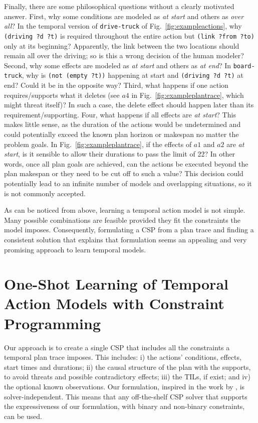 \documentclass[runningheads]{llncs}
\begin{document}
Finally, there are some philosophical questions without a clearly motivated answer. First, why some conditions are modeled as \emph{at start} and others as \emph{over all}? In the temporal version of \texttt{drive-truck} of Fig.~\ref{fig:exampleactions}, why \texttt{(driving ?d ?t)} is required throughout the entire action but \texttt{(link ?from ?to)} only at its beginning? Apparently, the link between the two locations should remain all over the driving; so is this a wrong decision of the human modeler?
Second, why some effects are modeled as \emph{at start} and others as \emph{at end}? In \texttt{board-truck}, why is \texttt{(not (empty ?t))} happening at start and \texttt{(driving ?d ?t)} at end? Could it be in the opposite way?
Third, what happens if one action requires/supports what it deletes (see $a4$ in Fig.~\ref{fig:exampleplantrace}, which might threat itself)? In such a case, the delete effect should happen later than its requirement/supporting.
Four, what happens if all effects are \emph{at start}? This makes little sense, as the duration of the actions would be undetermined and could potentially exceed the known plan horizon or makespan no matter the problem goals. In Fig.~\ref{fig:exampleplantrace}, if the effects of $a1$ and $a2$ are \emph{at start}, is it sensible to allow their durations to pass the limit of 22? In other words, once all plan goals are achieved, can the actions be executed beyond the plan makespan or they need to be cut off to such a value? This decision could potentially lead to an infinite number of models and overlapping situations, so it is not commonly accepted.

As can be noticed from above, learning a temporal action model is not simple. Many possible combinations are feasible provided they fit the constraints the model imposes. Consequently, formulating a CSP from a plan trace and finding a consistent solution that explains that formulation seems an appealing and very promising approach to learn temporal models.



\section{One-Shot Learning of Temporal Action Models with Constraint Programming}
\label{sec:CPformulation}

Our approach is to create a single CSP that includes all the constraints a temporal plan trace imposes. This includes: i) the actions' conditions, effects, start times and durations; ii) the causal structure of the plan with the supports, to avoid threats and possible contradictory effects; iii) the TILs, if exist; and iv) the optional known observations. Our formulation, inspired in the work by \cite{garrido2009constraint}, is solver-independent. This means that any off-the-shelf CSP solver that supports the expressiveness of our formulation, with binary and non-binary constraints, can be used.
\end{document}
